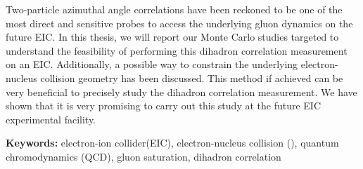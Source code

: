{Two-particle azimuthal angle correlations have been reckoned to be one of the
most direct and sensitive probes to access the underlying gluon dynamics on the
future EIC. In this thesis, we will report our Monte Carlo studies targeted to
understand the feasibility of performing this dihadron correlation measurement
on an EIC. Additionally, a possible way to constrain the underlying
electron-nucleus collision geometry has been discussed. This method if achieved
can be very beneficial to precisely study the dihadron correlation measurement.
We have shown that it is very promising to carry out this study at the future
EIC experimental facility.


\vspace{4mm}

\noindent
\textbf{Keywords:} electron-ion collider(EIC), electron-nucleus collision (\eA ), quantum chromodynamics (QCD), gluon saturation, dihadron correlation


}
